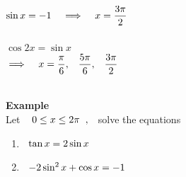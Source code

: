 \documentclass[11pt,a4paper]{article}
\begin{document}
\begin{enumerate}
$\sin x = -1 \hspace{0.3cm}\implies \hspace{0.3cm} x = \dfrac{3\pi}{2}$\\\\

$\cos 2x = \sin x$\\

$\implies\hspace{0.3cm} x = \dfrac{\pi}{6}, \hspace{0.3cm} \dfrac{5\pi}{6},\hspace{0.3cm} \dfrac{3\pi}{2}$\\\\
\end{enumerate}





\textbf{Example}\\
Let $\hspace{0.3cm} 0\leq x \leq 2\pi\hspace{0.2cm},\hspace{0.2cm}$ solve the equations
\begin{enumerate}
\item[i.] $\hspace{0.2cm} \tan x = 2\sin x$
\item[ii.] $\hspace{0.2cm} -2\sin^2x + \cos x = -1$\\
\end{enumerate}
\end{document}
